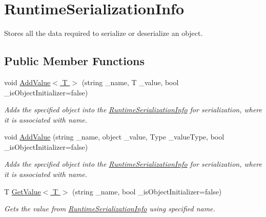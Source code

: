 \hypertarget{class_voxel_busters_1_1_runtime_serialization_1_1_runtime_serialization_info}{}\section{Runtime\+Serialization\+Info}
\label{class_voxel_busters_1_1_runtime_serialization_1_1_runtime_serialization_info}


Stores all the data required to serialize or deserialize an object.  


\subsection*{Public Member Functions}
\begin{DoxyCompactItemize}
\item 
void \hyperlink{class_voxel_busters_1_1_runtime_serialization_1_1_runtime_serialization_info_afc7377af684433c79b96aaa5cba28b8e}{Add\+Value$<$ T $>$} (string \+\_\+name, T \+\_\+value, bool \+\_\+is\+Object\+Initializer=false)
\begin{DoxyCompactList}\small\item\em Adds the specified object into the \hyperlink{class_voxel_busters_1_1_runtime_serialization_1_1_runtime_serialization_info}{Runtime\+Serialization\+Info} for serialization, where it is associated with name. \end{DoxyCompactList}\item 
void \hyperlink{class_voxel_busters_1_1_runtime_serialization_1_1_runtime_serialization_info_a2f81259a486737aca459d58b5e0dcde9}{Add\+Value} (string \+\_\+name, object \+\_\+value, Type \+\_\+value\+Type, bool \+\_\+is\+Object\+Initializer=false)
\begin{DoxyCompactList}\small\item\em Adds the specified object into the \hyperlink{class_voxel_busters_1_1_runtime_serialization_1_1_runtime_serialization_info}{Runtime\+Serialization\+Info} for serialization, where it is associated with name. \end{DoxyCompactList}\item 
T \hyperlink{class_voxel_busters_1_1_runtime_serialization_1_1_runtime_serialization_info_a05337b60778fbd1effa007cff1255dee}{Get\+Value$<$ T $>$} (string \+\_\+name, bool \+\_\+is\+Object\+Initializer=false)
\begin{DoxyCompactList}\small\item\em Gets the value from \hyperlink{class_voxel_busters_1_1_runtime_serialization_1_1_runtime_serialization_info}{Runtime\+Serialization\+Info} using specified name. \end{DoxyCompactList}\item 

\end{DoxyCompactItemize}
